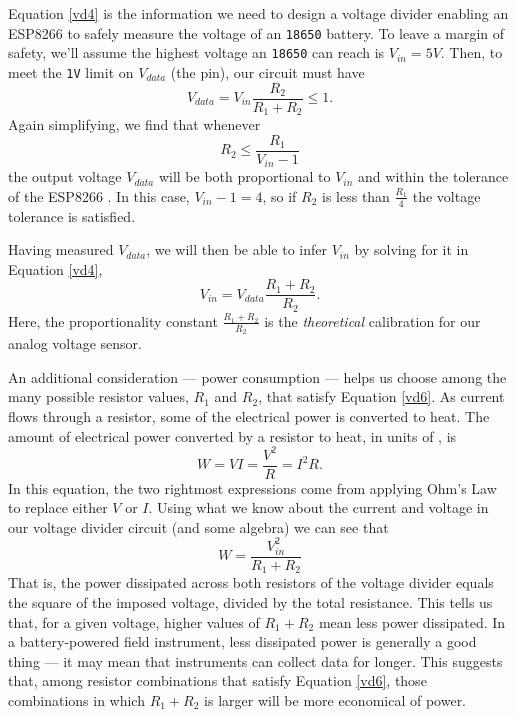 Equation \ref{vd4} is the information we need to design a voltage divider enabling an ESP8266 \adc to safely measure the voltage of an \texttt{18650} battery.
To leave a margin of safety, we'll assume the highest voltage an \texttt{18650} can reach is $V_{in}=5V$. Then, to meet the \texttt{1V} limit on $V_{data}$ (the \adc pin), our circuit must have
\begin{equation}\label{vd5}
V_{data} = V_{in} \frac{R_2}{R_1+R_2}  \le 1 .
\end{equation}
Again simplifying, we find that whenever
\begin{equation}\label{vd6}
R_2 \le \frac{R_1}{V_{in}-1} %
\end{equation}
the output voltage $V_{data}$ will be both proportional to $V_{in}$ and within the tolerance of the ESP8266 \adc.
In this case, $V_{in}-1 = 4$, so if $R_2$ is less than $\frac{R_1}{4}$ the voltage tolerance is satisfied.

Having measured $V_{data}$, we will then be able to infer $V_{in}$ by solving for it in Equation \ref{vd4},
\begin{equation}\label{vd7}
V_{in} = V_{data} \frac{R_1+R_2}{R_2}.
\end{equation}
Here, the proportionality constant $\frac{R_1+R_2}{R_2}$ is the \emph{theoretical} calibration for our analog voltage sensor.

An additional consideration --- power consumption --- helps us choose among the many possible resistor values, $R_1$ and $R_2$, that satisfy Equation \ref{vd6}. 
As current flows through a resistor, some of the electrical power is converted to heat.
The amount of electrical power converted by a resistor to heat, in units of , is
\begin{equation}\label{watts}
W = V I = \frac{V^2}{R} = I^2 R.
\end{equation} 
In this equation, the two rightmost expressions come from applying Ohm's Law to replace either $V$ or $I$.
Using what we know about the current and voltage in our voltage divider circuit (and some algebra) we can see that
\begin{equation}\label{watts2}
W = \frac{V_{in}^2}{R_1+R_2}
\end{equation}
That is, the power dissipated across both resistors of the voltage divider equals the square of the imposed voltage, divided by the total resistance.
This tells us that, for a given voltage, higher values of $R_1+R_2$ mean less power dissipated. 
In a battery-powered field instrument, less dissipated power is generally a good thing --- it may mean that instruments can collect data for longer.
This suggests that, among resistor combinations that satisfy  Equation \ref{vd6}, those combinations in which $R_1+R_2$ is larger will be more economical of power.

